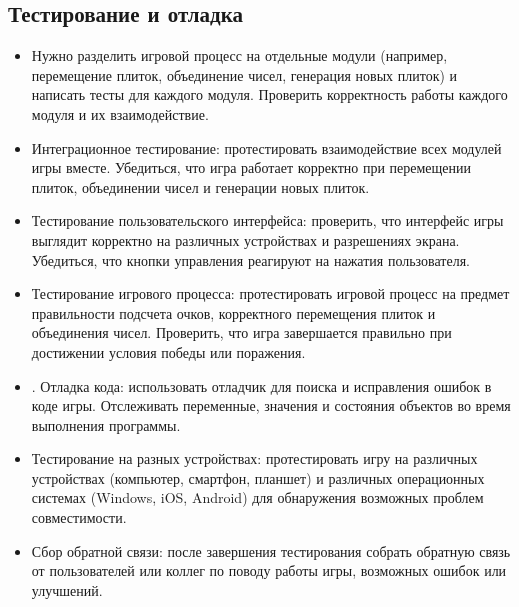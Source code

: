 \subsection{\label{subsec:ch01/sec01/sub02}Тестирование и отладка}
\begin{itemize}
\item Нужно разделить игровой процесс на отдельные модули (например, перемещение плиток, объединение чисел, генерация новых плиток) и написать тесты для каждого модуля. Проверить корректность работы каждого модуля и их взаимодействие.

\item Интеграционное тестирование: протестировать взаимодействие всех модулей игры вместе. Убедиться, что игра работает корректно при перемещении плиток, объединении чисел и генерации новых плиток.

\item Тестирование пользовательского интерфейса: проверить, что интерфейс игры выглядит корректно на различных устройствах и разрешениях экрана. Убедиться, что кнопки управления реагируют на нажатия пользователя.

\item Тестирование игрового процесса: протестировать игровой процесс на предмет правильности подсчета очков, корректного перемещения плиток и объединения чисел. Проверить, что игра завершается правильно при достижении условия победы или поражения.

\item. Отладка кода: использовать отладчик для поиска и исправления ошибок в коде игры. Отслеживать переменные, значения и состояния объектов во время выполнения программы.

\item Тестирование на разных устройствах: протестировать игру на различных устройствах (компьютер, смартфон, планшет) и различных операционных системах (Windows, iOS, Android) для обнаружения возможных проблем совместимости.

\item Сбор обратной связи: после завершения тестирования собрать обратную связь от пользователей или коллег по поводу работы игры, возможных ошибок или улучшений.
\end{itemize}
